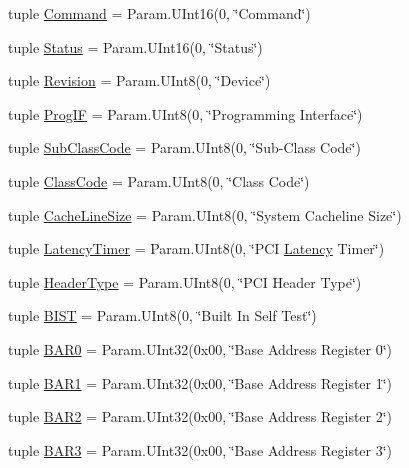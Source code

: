 \begin{DoxyCompactItemize}
\item 
tuple \hyperlink{classPci_1_1PciDevice_a46090a927141f497918fd0c87f782395}{Command} = Param.UInt16(0, \char`\"{}Command\char`\"{})
\item 
tuple \hyperlink{classPci_1_1PciDevice_aba3540dcad58fc3d3042791b42b96b98}{Status} = Param.UInt16(0, \char`\"{}Status\char`\"{})
\item 
tuple \hyperlink{classPci_1_1PciDevice_a3e8a079e8f2eda26d5e301091db1f5ee}{Revision} = Param.UInt8(0, \char`\"{}Device\char`\"{})
\item 
tuple \hyperlink{classPci_1_1PciDevice_ae1b2d8ef2a839fabf99be35121a8b6e8}{ProgIF} = Param.UInt8(0, \char`\"{}Programming Interface\char`\"{})
\item 
tuple \hyperlink{classPci_1_1PciDevice_aa5dab65525a81097713cebf095217409}{SubClassCode} = Param.UInt8(0, \char`\"{}Sub-\/Class Code\char`\"{})
\item 
tuple \hyperlink{classPci_1_1PciDevice_a9222bb7cddf99c695b0430f560974967}{ClassCode} = Param.UInt8(0, \char`\"{}Class Code\char`\"{})
\item 
tuple \hyperlink{classPci_1_1PciDevice_a5aa1725bb5acbc487d1870539a3d6104}{CacheLineSize} = Param.UInt8(0, \char`\"{}System Cacheline Size\char`\"{})
\item 
tuple \hyperlink{classPci_1_1PciDevice_af804bef2794d445f5c23651f77deccc3}{LatencyTimer} = Param.UInt8(0, \char`\"{}PCI \hyperlink{classm5_1_1params_1_1Latency}{Latency} Timer\char`\"{})
\item 
tuple \hyperlink{classPci_1_1PciDevice_a1124c5123a382ae26313212b03453e0f}{HeaderType} = Param.UInt8(0, \char`\"{}PCI Header Type\char`\"{})
\item 
tuple \hyperlink{classPci_1_1PciDevice_a3c577c0e81803b98a8618c482483eeb2}{BIST} = Param.UInt8(0, \char`\"{}Built In Self Test\char`\"{})
\item 
tuple \hyperlink{classPci_1_1PciDevice_a60fb126d4d1fa61ee963a802485a62b3}{BAR0} = Param.UInt32(0x00, \char`\"{}Base Address Register 0\char`\"{})
\item 
tuple \hyperlink{classPci_1_1PciDevice_ac14577636d310ffbce9d3e1c55071930}{BAR1} = Param.UInt32(0x00, \char`\"{}Base Address Register 1\char`\"{})
\item 
tuple \hyperlink{classPci_1_1PciDevice_a50e0986fba3f6efbdbb66dea13ac4813}{BAR2} = Param.UInt32(0x00, \char`\"{}Base Address Register 2\char`\"{})
\item 
tuple \hyperlink{classPci_1_1PciDevice_a8d29325a3868fc855f430913941a20b8}{BAR3} = Param.UInt32(0x00, \char`\"{}Base Address Register 3\char`\"{})

\end{DoxyCompactItemize}
